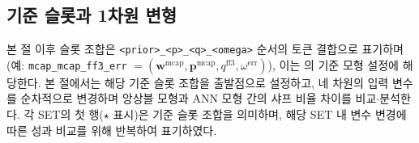 \documentclass{article}
\begin{document}
\subsection{기준 슬롯과 1차원 변형}\label{subsec:baseline_slot}

본 절 이후 슬롯 조합은 \texttt{<prior>\_<p>\_<q>\_<omega>} 순서의 토큰 결합으로 표기하며 (예: \texttt{mcap\_mcap\_ff3\_err} $= (\mathbf{w}^{\mathrm{mcap}}, \mathbf{p}^{\mathrm{mcap}}, q^{\mathrm{ff3}}, \omega^{\mathrm{err}})$), 이는 \citet{pyo2018}의 기준 모형 설정에 해당한다. 본 절에서는 해당 기준 슬롯 조합을 출발점으로 설정하고, 네 차원의 입력 변수를 순차적으로 변경하며 앙상블 모형과 ANN 모형 간의 샤프 비율 차이를 비교$\cdot$분석한다. 각 SET의 첫 행($\star$ 표시)은 기준 슬롯 조합을 의미하며, 해당 SET 내 변수 변경에 따른 성과 비교를 위해 반복하여 표기하였다.
\end{document}
